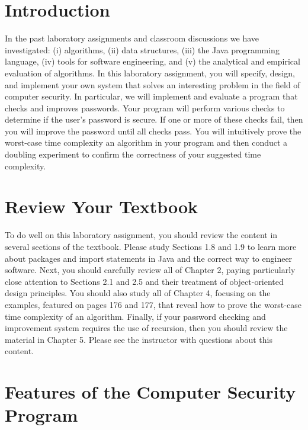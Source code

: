 

\usepackage[compact]{titlesec}


\section*{Introduction}

In the past laboratory assignments and classroom discussions we have investigated: (i) algorithms, (ii) data structures,
(iii) the Java programming language, (iv) tools for software engineering, and (v) the analytical and empirical
evaluation of algorithms. In this laboratory assignment, you will specify, design, and implement your own system that
solves an interesting problem in the field of computer security. In particular, we will implement and evaluate a program
that checks and improves passwords. Your program will perform various checks to determine if the user's password is
secure. If one or more of these checks fail, then you will improve the password until all checks pass. You will
intuitively prove the worst-case time complexity an algorithm in your program and then conduct a doubling experiment to
confirm the correctness of your suggested time complexity.

\section*{Review Your Textbook}

To do well on this laboratory assignment, you should review the content in several sections of the textbook. Please
study Sections 1.8 and 1.9 to learn more about packages and import statements in Java and the correct way to engineer
software. Next, you should carefully review all of Chapter 2, paying particularly close attention to Sections 2.1 and
2.5 and their treatment of object-oriented design principles. You should also study all of Chapter 4, focusing on the
examples, featured on pages 176 and 177, that reveal how to prove the worst-case time complexity of an algorithm.
Finally, if your password checking and improvement system requires the use of recursion, then you should review the
material in Chapter 5. Please see the instructor with questions about this content.

\section*{Features of the Computer Security Program}


